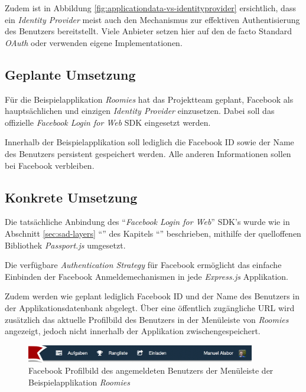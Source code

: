 Zudem ist in Abbildung \ref{fig:applicationdata-vs-identityprovider} ersichtlich, dass ein \emph{Identity Provider} meist auch den Mechanismus zur effektiven Authentisierung des Benutzers bereitstellt. Viele Anbieter setzen hier auf den de facto Standard \emph{OAuth} \cite{oauth} oder verwenden eigene Implementationen.


\subsection*{Geplante Umsetzung}

Für die Beispielapplikation \emph{Roomies} hat das Projektteam geplant, Facebook als hauptsächlichen und einzigen \emph{Identity Provider} einzusetzen. Dabei soll das offizielle \emph{Facebook Login for Web} \cite{facebooklogin} \gls{SDK} eingesetzt werden.

Innerhalb der Beispielapplikation soll lediglich die Facebook ID sowie der Name des Benutzers persistent gespeichert werden. Alle anderen Informationen sollen bei Facebook verbleiben.


\subsection*{Konkrete Umsetzung}

Die tatsächliche Anbindung des ``\emph{Facebook Login for Web}'' \cite{facebooklogin} \gls{SDK}'s wurde wie in Abschnitt \ref{sec:sad-layers} ``'' des Kapitels ``'' beschrieben, mithilfe der quelloffenen Bibliothek \emph{Passport.js} \cite{Passportjs} umgesetzt.

Die verfügbare \emph{Authentication Strategy} für Facebook \cite{passport-facebook} ermöglicht das einfache Einbinden der Facebook Anmeldemechanismen in jede \emph{Express.js} Applikation.

Zudem werden wie geplant lediglich Facebook ID und der Name des Benutzers in der Applikationsdatenbank abgelegt. Über eine öffentlich zugängliche \gls{URL} \cite{facebook-profilepicture} wird zusätzlich das aktuelle Profilbild des Benutzers in der Menüleiste von \emph{Roomies} angezeigt, jedoch nicht innerhalb der Applikation zwischengespeichert.

\begin{figure}[H]
	\centering
	\includegraphics[width=10cm]{content/principle-demonstration/images/roomies-navigation-loggedin.png}
	\caption{Facebook Profilbild des angemeldeten Benutzers der Menüleiste der Beispielapplikation \emph{Roomies}}
	\label{fig:facebook-profilepicture-roomies}
\end{figure}


